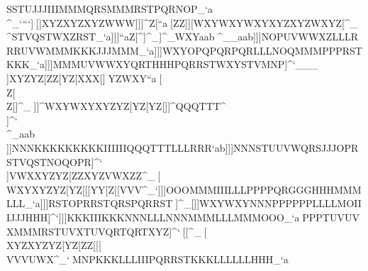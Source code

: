 SSTUJJJIIIMMMQRSMMMRSTPQRNOP_`a                                                            \\\KKKKKKRSTUVXRSTPQRPQRRSTXYZQRS^_`                                                            ```]^^\]]XYZXYZXYZWWW\]]]]^Z[\XYZ``a                                                            ^^^[\]ZZ\ZZ[XYZYZ[XYZWXYVWXVWXWXY[\]                                                            ]]][\]WXYWXYWXYXYZXYZWXYZ[\YZ[QQQ]^_                                                            \\\XYZSTVPQRRSUSUV\]^STVQSTWXZRST_`a                                                            ]]]``aZ[\WXY\]^]^_]^_WXYaab^^_^__aab                                                            ]]]NOPUVWWXZLLLRRRUVWMMMKKKJJJMMM_`a                                                            ]]]WXYOPQPQRPQRLLLNOQMMMPPPRSTKKK_`a                                                            ]]]MMMUVWWXYQRTHHHPQRRSTWXYSTVMNP]^`                                                            ___\\]XYZYZ[ZZ[YZ[XXX[\]]^^XYZWXY``a                                                            ^^^[\\Z[\[\]Z[\WXYWXYWXYWXYWXYXYZ]^_                                                            ^^^]]^WXYWXYXYZYZ[YZ[YZ[]]^QQQTTT\]^                                                            \\\KKKLLLOOOLLLTUWRSTUVWQRSJJJMNO]^`                                                            \\\YZ[PQRVWXSTVVWXOPQXYZ``a^^_]^_aab                                                            \\\NOPZ[\XYZPPPRRRNNNJJJNNNJJJLLL^_`                                                            ]]]NNNKKKKKKKKKIIIIIIQQQTTTLLLRRR`ab                                                            ]]]NNNSTUUVWQRSJJJOPRSTVQSTNOQOPR]^`                                                            ^^^\\]VWXXYZYZ[ZZ\VVVZ[\Z[\XYZXYZ``a                                                            ^^^\\]XYZVWXZZ\Z[\XYZVWXWXYWXYYZ[]^_                                                            ^^^[\\WXYXYZYZ[YZ[[\]\]]YY[Z[[VVV^_`                                                            ]]]OOOMMMIIILLLPPPPQRGGGHHHMMMLLL_`a                                                            ]]]RSTOPRRSTQRSPQRRST^^_]^_[]]WXYWXYNNNPPPPPPLLLLMOIIIJJJHHH]^`                                                            ]]]KKKIIIKKKNNNLLLNNNMMMLLLMMMOOO_`a                                                            ^^^PPPTUVUVXMMMRSTUVXTUVQRTQRTXYZ]^`                                                            ^^^[[\WXYZZ[ZZ[[[\VVVYZ[Z[\ZZ\YZ[``a                                                            ^^^YZ[XYZXYZXYZWXYYZ[YZ[XYZYZ[WXY]^_                                                            ^^^[\\XYZXYZYZ[YZ[ZZ[[[\[\]VVVUWX^_`                                                            ^^^MNPKKKLLLIIIPQRRSTKKKLLLLLLHHH_`a                                 